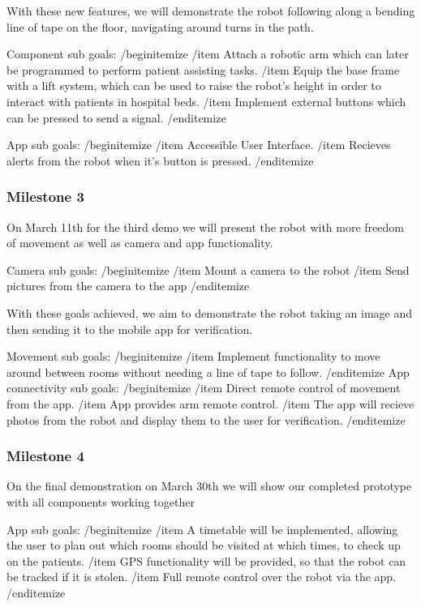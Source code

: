 \documentclass{article}
\begin{document}
With these new features, we will demonstrate the robot following along a bending line of tape on the floor, navigating around turns in the path.

Component sub goals:
/begin{itemize}
/item Attach a robotic arm which can later be programmed to perform patient assisting tasks.
/item Equip the base frame with a lift system, which can be used to raise the robot's height in order to interact with patients in hospital beds.
/item Implement external buttons which can be pressed to send a signal.
/end{itemize}

App sub goals:
/begin{itemize}
/item Accessible User Interface.
/item Recieves alerts from the robot when it's button is pressed.
/end{itemize}

\subsubsection{Milestone 3}

On March 11th for the third demo we will present the robot with more freedom of movement as well as camera and app functionality.

Camera sub goals:
/begin{itemize}
/item Mount a camera to the robot
/item Send pictures from the camera to the app
/end{itemize}

With these goals achieved, we aim to demonstrate the robot taking an image and then sending it to the mobile app for verification.

Movement sub goals:
/begin{itemize}
/item Implement functionality to move around between rooms without needing a line of tape to follow.
/end{itemize}
App connectivity sub goals:
/begin{itemize}
/item Direct remote control of movement from the app.
/item App provides arm remote control.
/item The app will recieve photos from the robot and display them to the user for verification.
/end{itemize}

\subsubsection{Milestone 4}

On the final demonstration on March 30th we will show our completed prototype with all components working together

App sub goals:
/begin{itemize}
/item  A timetable will be implemented, allowing the user to plan out which rooms should be visited at which times, to check up on the patients.
/item GPS functionality will be provided, so that the robot can be tracked if it is stolen.
/item Full remote control over the robot via the app.
/end{itemize}
\end{document}
